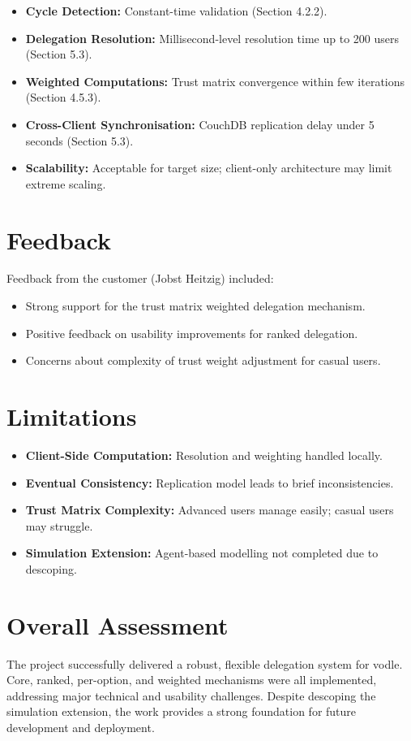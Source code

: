 \begin{itemize}
    \item \textbf{Cycle Detection:} Constant-time validation (Section 4.2.2).
    \item \textbf{Delegation Resolution:} Millisecond-level resolution time up to 200 users (Section 5.3).
    \item \textbf{Weighted Computations:} Trust matrix convergence within few iterations (Section 4.5.3).
    \item \textbf{Cross-Client Synchronisation:} CouchDB replication delay under 5 seconds (Section 5.3).
    \item \textbf{Scalability:} Acceptable for target size; client-only architecture may limit extreme scaling.
\end{itemize}

\section{Feedback}

Feedback from the customer (Jobst Heitzig) included:

\begin{itemize}
    \item Strong support for the trust matrix weighted delegation mechanism.
    \item Positive feedback on usability improvements for ranked delegation.
    \item Concerns about complexity of trust weight adjustment for casual users.
\end{itemize}

\section{Limitations}

\begin{itemize}
    \item \textbf{Client-Side Computation:} Resolution and weighting handled locally.
    \item \textbf{Eventual Consistency:} Replication model leads to brief inconsistencies.
    \item \textbf{Trust Matrix Complexity:} Advanced users manage easily; casual users may struggle.
    \item \textbf{Simulation Extension:} Agent-based modelling not completed due to descoping.
\end{itemize}

\section{Overall Assessment}

The project successfully delivered a robust, flexible delegation system for vodle. Core, ranked, per-option, and weighted mechanisms were all implemented, addressing major technical and usability challenges. Despite descoping the simulation extension, the work provides a strong foundation for future development and deployment.
